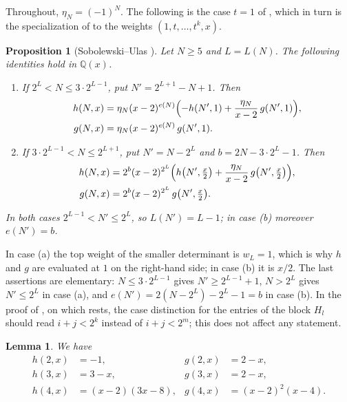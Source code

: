 \documentclass{amsart}
\newtheorem{proposition}[theorem]{Proposition}
\newtheorem{lemma}[theorem]{Lemma}
\theoremstyle{definition}
\theoremstyle{remark}
\numberwithin{equation}{section}
\newcommand{\Q}{\mathbb{Q}}
\begin{document}
Throughout, $\eta_N=(-1)^N$. The following is the case $t=1$ of \cite[Proposition~4.3]{SU}, which in turn is the specialization of \cite[Theorem~4.2]{SU} to the weights $(1,t,\dots,t^k,x)$.

\begin{proposition}[{Sobolewski--Ulas \cite[Proposition~4.3]{SU}}]\label{prop:SU}
Let $N\ge5$ and $L=L(N)$. The following identities hold in $\Q(x)$.
\begin{enumerate}
\item[(a)] If $2^L<N\le3\cdot2^{L-1}$, put $N'=2^{L+1}-N+1$. Then
\begin{align*}
h(N,x)&=\eta_N(x-2)^{e(N)}\Bigl(-h(N',1)+\frac{\eta_N}{x-2}\,g(N',1)\Bigr),\\
g(N,x)&=\eta_N(x-2)^{e(N)}\,g(N',1).
\end{align*}
\item[(b)] If $3\cdot2^{L-1}<N\le2^{L+1}$, put $N'=N-2^L$ and $b=2N-3\cdot2^L-1$. Then
\begin{align*}
h(N,x)&=2^{b}(x-2)^{2^L}\Bigl(h\bigl(N',\tfrac x2\bigr)+\frac{\eta_N}{x-2}\,g\bigl(N',\tfrac x2\bigr)\Bigr),\\
g(N,x)&=2^{b}(x-2)^{2^L}\,g\bigl(N',\tfrac x2\bigr).
\end{align*}
\end{enumerate}
In both cases $2^{L-1}<N'\le2^L$, so $L(N')=L-1$; in case \textup{(b)} moreover $e(N')=b$.
\end{proposition}

In case (a) the top weight of the smaller determinant is $w_L=1$, which is why $h$ and $g$ are evaluated at $1$ on the right-hand side; in case (b) it is $x/2$. The last assertions are elementary: $N\le3\cdot2^{L-1}$ gives $N'\ge2^{L-1}+1$, $N>2^L$ gives $N'\le 2^L$ in case (a), and $e(N')=2(N-2^L)-2^L-1=b$ in case (b). In the proof of \cite[Proposition~4.1]{SU}, on which \cite[Theorem~4.2]{SU} rests, the case distinction for the entries of the block $H_l$ should read $i+j<2^k$ instead of $i+j<2^m$; this does not affect any statement.

\begin{lemma}\label{lem:small}
We have
\begin{align*}
h(2,x)&=-1, & g(2,x)&=2-x,\\
h(3,x)&=3-x, & g(3,x)&=2-x,\\
h(4,x)&=(x-2)(3x-8), & g(4,x)&=(x-2)^2(x-4).
\end{align*}
\end{lemma}
\end{document}
